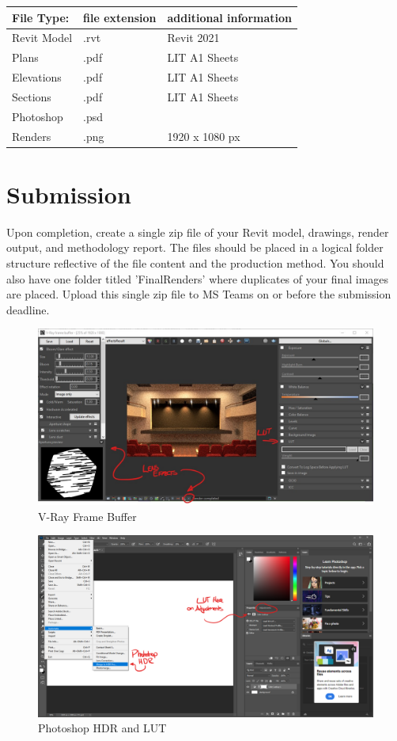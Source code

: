\begin{tabularx}{\textwidth}{ |X|X|X| }
	\hline
	\textbf{File Type:} & file extension & additional information\\
	\hline 
	Revit Model  & .rvt & Revit 2021 \\
	Plans & .pdf & LIT A1 Sheets \\
	Elevations & .pdf & LIT A1 Sheets \\
	Sections & .pdf & LIT A1 Sheets \\
	Photoshop  & .psd &  \\	
	Renders  & .png & 1920 x 1080 px\\
	\hline
\end{tabularx}




\section*{Submission}
Upon completion, create a single zip file of your Revit model, drawings, render output, and methodology report.  The files should be placed in a logical folder structure reflective of the file content and the production method.  You should also have one folder titled 'FinalRenders' where duplicates of your final images are placed.  Upload this single zip file to MS Teams on or before the submission deadline.


\begin{figure}[h]
	\centering
	\includegraphics[width=1.0\linewidth]{img/VRayFrameBuffer.jpg}
	\caption{V-Ray Frame Buffer}
	\label{fig:VRayFrameBuffer}
\end{figure}

\begin{figure}[h]
	\centering
	\includegraphics[width=1.0\linewidth]{img/Photoshop.png}
	\caption{Photoshop HDR and LUT}
	\label{fig:PS-HDR-LUT}
\end{figure}



